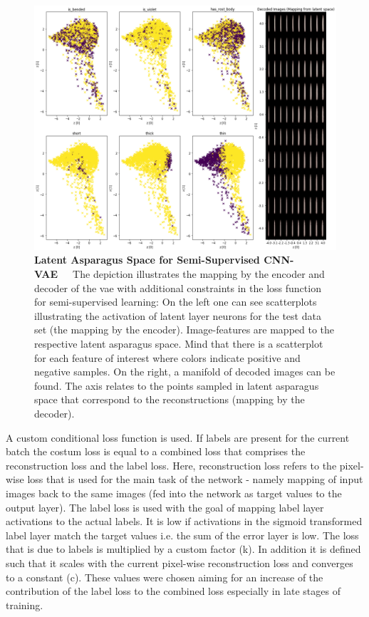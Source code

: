 \begin{figure}[!htb]
	\centering
	\includegraphics[scale=0.35]{Figures/chapter04/semi_supervised_latent_asparagus.png}
	\decoRule
	\caption[Semi-Supervised Convolutional VAE Latent Asparagus Space]{\textbf{Latent Asparagus Space for Semi-Supervised CNN-VAE}~~~The depiction illustrates the mapping by the encoder and decoder of the \acrlong{vae} with additional constraints in the loss function for semi-supervised learning: On the left one can see scatterplots illustrating the activation of latent layer neurons for the test data set (the mapping by the encoder). Image-features are mapped to the respective latent asparagus space. Mind that there is a scatterplot for each feature of interest where colors indicate positive and negative samples. On the right, a manifold of decoded images can be found. The axis relates to the points sampled in latent asparagus space that correspond to the reconstructions (mapping by the decoder).}
	\label{fig:SemiSupervisedLatentSpace}
\end{figure}

A custom conditional loss function is used. If labels are present for the current batch the costum loss is equal to a combined loss that comprises the reconstruction loss and the label loss. Here, reconstruction loss refers to the pixel-wise loss that is used for the main task of the network - namely mapping of input images back to the same images (fed into the network as target values to the output layer). The label loss is used with the goal of mapping label layer activations to the actual labels. It is low if activations in the sigmoid transformed label layer match the target values i.e. the sum of the error layer is low. The loss that is due to labels is multiplied by a custom factor (k). In addition it is defined such that it scales with the current pixel-wise reconstruction loss and converges to a constant (c). These values were chosen aiming for an increase of the contribution of the label loss to the combined loss especially in late stages of training.

